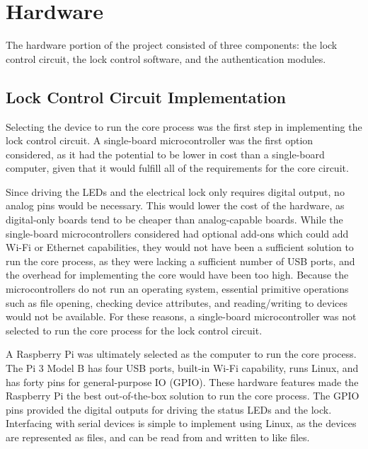 \documentclass[12pt]{report}
\let\Oldsection\section
\renewcommand{\section}{\FloatBarrier\Oldsection}
\let\Oldsubsection\subsection
\renewcommand{\subsection}{\FloatBarrier\Oldsubsection}
\begin{document}

\section{Hardware} \label{hardware}

The hardware portion of the project consisted of three components: the lock control circuit, the lock control software, 
and the authentication modules.

\subsection{Lock Control Circuit Implementation} \label{section:lock-control-circuit-implementation}

Selecting the device to run the core process was the first step in implementing the lock control circuit. A 
single-board microcontroller was the first option considered, as it had the potential to be lower in cost than a 
single-board computer, given that it would fulfill all of the requirements for the core circuit.

Since driving the LEDs and the electrical lock only requires digital output, no analog pins would be necessary. This 
would lower the cost of the hardware, as digital-only boards tend to be cheaper than analog-capable boards. While 
the single-board microcontrollers considered had optional add-ons which could add Wi-Fi or Ethernet capabilities, they 
would not have been a sufficient solution to run the core process, as they were lacking a sufficient number of USB 
ports, and the overhead for implementing the core would have been too high. Because the microcontrollers do not run an 
operating system, essential primitive operations such as file opening, checking device attributes, and reading/writing
to devices would not be available. For these reasons, a single-board microcontroller was not selected to run the core 
process for the lock control circuit.

A Raspberry Pi was ultimately selected as the computer to run the core process. The Pi 3 Model B has four USB ports, 
built-in Wi-Fi capability, runs Linux, and has forty pins for general-purpose IO (GPIO). These hardware features made the
Raspberry Pi the best out-of-the-box solution to run the core process. The GPIO pins provided the digital outputs for 
driving the status LEDs and the lock. Interfacing with serial devices is simple to implement using Linux, as the devices 
are represented as files, and can be read from and written to like files.
\end{document}

